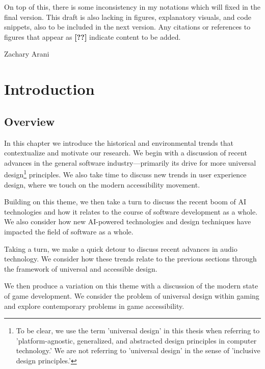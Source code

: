 \documentclass{report}
\begin{document}
On top of this, there is some inconsistency in my notations which will fixed in the final version. This draft is also lacking in figures, explanatory visuals, and code snippets, also to be included in the next version. Any citations or references to figures that appear as \textbf{[??]} indicate content to be added.

\begin{flushright}
\vspace{5mm}
Zachary Arani
\\
\date{\today}
\end{flushright}

\tableofcontents{} %
\newpage{} %



\chapter{Introduction}

\section{Overview}
In this chapter we introduce the historical and environmental trends that contextualize and motivate our research. We begin with a discussion of recent advances in the general software industry---primarily its drive for more universal design\footnote{To be clear, we use the term 'universal design' in this thesis when referring to 'platform-agnostic, generalized, and abstracted design principles in computer technology.' We are not referring to 'universal design' in the sense of 'inclusive design principles.'} principles. We also take time to discuss new trends in user experience design, where we touch on the modern accessibility movement.

Building on this theme, we then take a turn to discuss the recent boom of AI technologies and how it relates to the course of software development as a whole. We also consider how new AI-powered technologies and design techniques have impacted the field of software as a whole.

Taking a turn, we make a quick detour to discuss recent advances in audio technology. We consider how these trends relate to the previous sections through the framework of universal and accessible design.

We then produce a variation on this theme with a discussion of the modern state of game development. We consider the problem of universal design within gaming and explore contemporary problems in game accessibility. 
\end{document}
